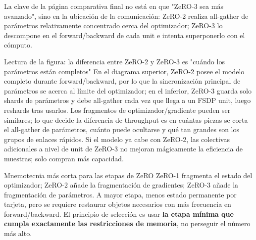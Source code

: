 La clave de la página comparativa final no está en que "ZeRO-3 sea más avanzado", sino en la ubicación de la comunicación: ZeRO-2 realiza all-gather de parámetros relativamente concentrado cerca del optimizador; ZeRO-3 lo descompone en el forward/backward de cada unit e intenta superponerlo con el cómputo.



\begin{knowledgebox}{Lectura de la figura: la diferencia entre ZeRO-2 y ZeRO-3 es "cuándo los parámetros están completos"}
En el diagrama superior, ZeRO-2 posee el modelo completo durante forward/backward, por lo que la sincronización principal de parámetros se acerca al límite del optimizador; en el inferior, ZeRO-3 guarda solo shards de parámetros y debe all-gather cada vez que llega a un FSDP unit, luego reshards tras usarlos. Los fragmentos de optimizador/gradiente pueden ser similares; lo que decide la diferencia de throughput es en cuántas piezas se corta el all-gather de parámetros, cuánto puede ocultarse y qué tan grandes son los grupos de enlaces rápidos. Si el modelo ya cabe con ZeRO-2, las colectivas adicionales a nivel de unit de ZeRO-3 no mejoran mágicamente la eficiencia de muestras; solo compran más capacidad.
\end{knowledgebox}


\begin{importantbox}{Mnemotecnia más corta para las etapas de ZeRO}
ZeRO-1 fragmenta el estado del optimizador; ZeRO-2 añade la fragmentación de gradientes; ZeRO-3 añade la fragmentación de parámetros. A mayor etapa, menos estado permanente por tarjeta, pero se requiere restaurar objetos necesarios con más frecuencia en forward/backward. El principio de selección es usar \textbf{la etapa mínima que cumpla exactamente las restricciones de memoria}, no perseguir el número más alto.
\end{importantbox}

